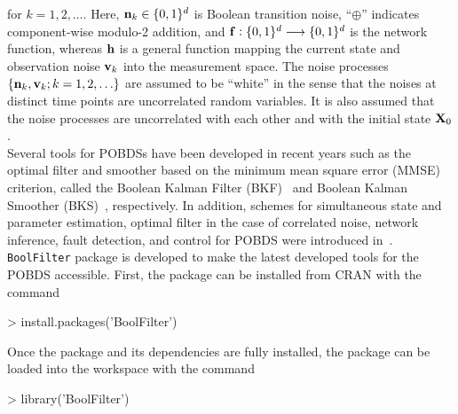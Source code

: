 \documentclass[a4paper]{article}
\theoremstyle{plain}
\theoremstyle{definition}
\theoremstyle{remark}
\def\f{{\bf{f}}}
\def\h{{\bf{h}}}
\def\nk{{\bf n}_k}
\def\vk{{\bf v}_k}
\def\Xz{{\bf X}_0}
\def\vk{{\bf v}_k}
\begin{document}
for $k=1,2,\ldots$. Here, $\nk \in \{0,1\}^d$ is Boolean transition noise,
``$\oplus$'' indicates component-wise
modulo-2 addition, and $\f: \{0,1\}^{d} \longrightarrow \{0,1\}^d$ is the network function,
whereas $\h$ is a
general function mapping the current state and observation noise $\vk$
into the measurement space. The
noise processes $\{\nk, \vk; k=1,2,\ldots\}$ are assumed to be
``white'' in the sense that the noises at distinct time points are
uncorrelated random variables.  
It is also assumed that the
noise processes are uncorrelated with each other and with the initial
 state $\Xz$.\\[1em]
Several tools for POBDSs have been developed in recent years such as the optimal filter and smoother based on the minimum mean square error (MMSE) criterion, called the Boolean Kalman Filter (BKF)~\cite{Brag:11} and Boolean Kalman Smoother (BKS)~\cite{ImanBrag:15b}, respectively. In addition, schemes for simultaneous state and parameter estimation, optimal filter in the case of correlated noise, network inference, fault detection, and control for POBDS were introduced in~\cite{ImanBrag:16b}\cite{LeviBrag:17}\cite{ImanBrag:15a}\cite{BahaBrag:15}\cite{ImanBrag:16a}\cite{ImanBrag:16c}.
\\[1em]
\texttt{BoolFilter} package is developed to make the latest developed tools for the POBDS accessible. First, the package can be installed from CRAN with the command 
 
\begin{Sinput}
> install.packages('BoolFilter')
\end{Sinput}

Once the package and its dependencies are fully installed, the package can be loaded into the workspace with the command 

\begin{Schunk}
\begin{Sinput}
> library('BoolFilter')
\end{Sinput}
\end{Schunk}
\end{document}
